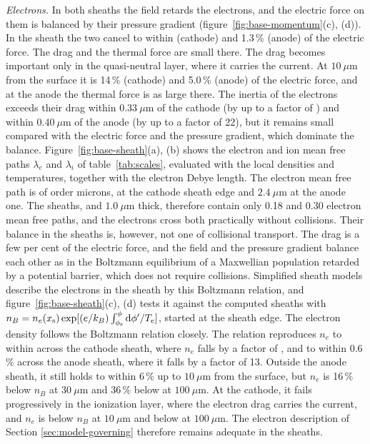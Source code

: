 \emph{Electrons.} In both sheaths the field retards the electrons, and the electric force on them is balanced by their pressure gradient (figure~\ref{fig:base-momentum}(c), (d)). In the sheath the two cancel to within  (cathode) and 1.3\,\% (anode) of the electric force. The drag and the thermal force are small there. The drag becomes important only in the quasi-neutral layer, where it carries the current. At \(10\ \mu\)m from the surface it is 14\,\% (cathode) and 5.0\,\% (anode) of the electric force, and at the anode the thermal force is as large there. The inertia of the electrons exceeds their drag within \(0.33\ \mu\)m of the cathode (by up to a factor of ) and within \(0.40\ \mu\)m of the anode (by up to a factor of 22), but it remains small compared with the electric force and the pressure gradient, which dominate the balance. Figure~\ref{fig:base-sheath}(a), (b) shows the electron and ion mean free paths \(\lambda_e\) and \(\lambda_i\) of table~\ref{tab:scales}, evaluated with the local densities and temperatures, together with the electron Debye length. The electron mean free path is of order microns,  at the cathode sheath edge and \(2.4\ \mu\)m at the anode one. The sheaths,  and \(1.0\ \mu\)m thick, therefore contain only 0.18 and 0.30 electron mean free paths, and the electrons cross both practically without collisions. Their balance in the sheaths is, however, not one of collisional transport. The drag is a few per cent of the electric force, and the field and the pressure gradient balance each other as in the Boltzmann equilibrium of a Maxwellian population retarded by a potential barrier, which does not require collisions. Simplified sheath models describe the electrons in the sheath by this Boltzmann relation, and figure~\ref{fig:base-sheath}(c), (d) tests it against the computed sheaths with \(n_B=n_e(x_{\rm s})\exp[(e/k_B)\int_{\phi_{\rm s}}^{\phi}{\rm d}\phi'/T_e]\), started at the sheath edge. The electron density follows the Boltzmann relation closely. The relation reproduces \(n_e\) to within  across the cathode sheath, where \(n_e\) falls by a factor of , and to within 0.6\,\% across the anode sheath, where it falls by a factor of 13. Outside the anode sheath, it still holds to within 6\,\% up to \(10\ \mu\)m from the surface, but \(n_e\) is 16\,\% below \(n_B\) at \(30\ \mu\)m and 36\,\% below at \(100\ \mu\)m. At the cathode, it fails progressively in the ionization layer, where the electron drag carries the current, and \(n_e\) is  below \(n_B\) at \(10\ \mu\)m and  below at \(100\ \mu\)m. The electron description of Section \ref{sec:model-governing} therefore remains adequate in the sheaths.

